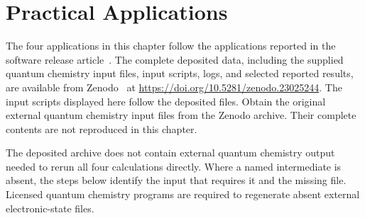 \chapter{Practical Applications}\label{chap-tutorials}
The four applications in this chapter follow the applications reported in the software release article~\cite{Diabat2026}. The complete deposited data, including the supplied quantum chemistry input files, \progname{} input scripts, logs, and selected reported results, are available from Zenodo~\cite{DiabatPaperData2026} at \url{https://doi.org/10.5281/zenodo.23025244}. The \progname{} input scripts displayed here follow the deposited files. Obtain the original external quantum chemistry input files from the Zenodo archive. Their complete contents are not reproduced in this chapter.

The deposited archive does not contain external quantum chemistry output needed to rerun all four calculations directly. Where a named intermediate is absent, the steps below identify the input that requires it and the missing file. Licensed quantum chemistry programs are required to regenerate absent external electronic-state files.




